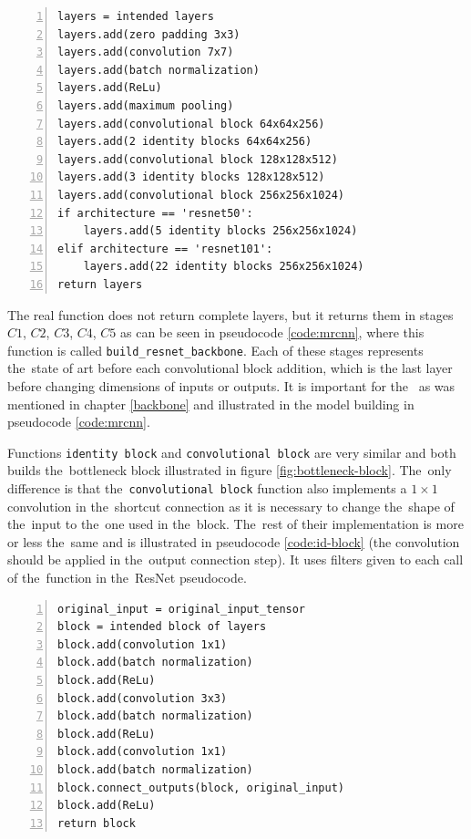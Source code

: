 {\scriptsize
\begin{lstlisting}[style=python, caption={Building the ResNet backbone 
architecture}, captionpos=b, label=code:resnet, deletekeywords={from, max},
backgroundcolor = \color{light-gray}, numbers=left, breaklines=true]
layers = intended layers
layers.add(zero padding 3x3)
layers.add(convolution 7x7)
layers.add(batch normalization)
layers.add(ReLu)
layers.add(maximum pooling)
layers.add(convolutional block 64x64x256)
layers.add(2 identity blocks 64x64x256)
layers.add(convolutional block 128x128x512)
layers.add(3 identity blocks 128x128x512)
layers.add(convolutional block 256x256x1024)
if architecture == 'resnet50':
    layers.add(5 identity blocks 256x256x1024)
elif architecture == 'resnet101':
    layers.add(22 identity blocks 256x256x1024)
return layers
\end{lstlisting}}

The real function does not return complete layers, but it returns them in stages 
$C1$, $C2$, $C3$, $C4$, $C5$ as can be seen in pseudocode \ref{code:mrcnn}, 
where this function is called \verb|build_resnet_backbone|. Each of these stages 
represents the~state of art before each convolutional block addition, which is 
the last layer before changing dimensions of inputs or outputs. It is important 
for the~ as was mentioned in chapter \ref{backbone} and illustrated in 
the model building in pseudocode \ref{code:mrcnn}.

Functions \verb|identity block| and \verb|convolutional block| are very similar 
and both builds the~bottleneck block illustrated in figure \ref{fig:bottleneck-block}.
The~only difference is that the~\verb|convolutional block| function also implements 
a $1 \times 1$ convolution in the~shortcut connection as it is necessary to 
change the~shape of the~input to the~one used in the~block. The~rest of their 
implementation is more or less the~same and is illustrated in pseudocode 
\ref{code:id-block} (the convolution should be applied in the~output connection 
step). It uses filters given to each call of the~function in the~ResNet 
pseudocode.

{\scriptsize
\begin{lstlisting}[style=python, caption={identity\_block}, captionpos=b, 
label=code:id-block, deletekeywords={from, input},
backgroundcolor = \color{light-gray}, numbers=left, breaklines=true]
original_input = original_input_tensor
block = intended block of layers
block.add(convolution 1x1)
block.add(batch normalization)
block.add(ReLu)
block.add(convolution 3x3)
block.add(batch normalization)
block.add(ReLu)
block.add(convolution 1x1)
block.add(batch normalization)
block.connect_outputs(block, original_input)
block.add(ReLu)
return block
\end{lstlisting}}

